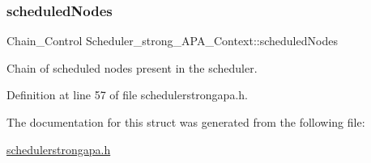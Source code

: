\subsubsection{\texorpdfstring{scheduled\+Nodes}{scheduledNodes}}
{\footnotesize\ttfamily Chain\+\_\+\+Control Scheduler\+\_\+strong\+\_\+\+A\+P\+A\+\_\+\+Context\+::scheduled\+Nodes}



Chain of scheduled nodes present in the scheduler. 



Definition at line 57 of file schedulerstrongapa.\+h.



The documentation for this struct was generated from the following file\+:\begin{DoxyCompactItemize}
\item 
\hyperlink{schedulerstrongapa_8h}{schedulerstrongapa.\+h}\end{DoxyCompactItemize}
